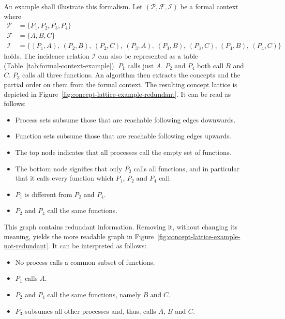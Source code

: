 \documentclass[a4paper, final, diplominf]{zih-template}
\begin{document}
An example shall illustrate this formalism.
Let $(\mathcal{P}, \mathcal{F}, \mathcal{I})$ be a formal context where
\begin{equation*}
	\begin{aligned}
		\mathcal{P} & = \{P_1, P_2, P_3, P_4\} \\
		\mathcal{F} & = \{A, B, C\} \\
		\mathcal{I} & = \big\{(P_1, A),~(P_2, B),~ (P_2, C),~ (P_3, A),~ (P_3, B),~ (P_3, C),~ (P_4, B),~ (P_4, C)\big\}
	\end{aligned}
\end{equation*}
holds. The incidence relation $\mathcal{I}$ can also be represented as a table (Table~\ref{tab:formal-context-example}).
$P_1$ calls just $A$. $P_2$ and $P_4$ both call $B$ and $C$. $P_3$ calls all three functions.
An algorithm then extracts the concepts and the partial order on them from the formal context.
The resulting concept lattice is depicted in Figure~\ref{fig:concept-lattice-example-redundant}.
It can be read as follows:
\begin{itemize}
	\item Process sets subsume  those that are reachable following edges downwards.\vspace{-0.5ex}
	\item Function sets subsume those that are reachable following edges upwards.\vspace{-0.5ex}
	\item The top node indicates that all processes call the empty set of functions.\vspace{-0.5ex}
	\item The bottom node signifies that only $P_3$ calls all functions, and in particular that it calls every function which $P_1$, $P_2$ and $P_4$ call.\vspace{-0.5ex}
	\item $P_1$ is different from $P_2$ and $P_4$.\vspace{-0.5ex}
	\item $P_2$ and $P_4$ call the same functions.
\end{itemize}
This graph contains redundant information.
Removing it, without changing its meaning, yields the more readable graph in Figure~\ref{fig:concept-lattice-example-not-redundant}.
It can be interpreted as follows:
\begin{itemize}
	\item No process calls a common subset of functions.\vspace{-0.5ex}
	\item $P_1$ calls $A$.\vspace{-0.5ex}
	\item $P_2$ and $P_4$ call the same functions, namely $B$ and $C$.\vspace{-0.5ex}
	\item $P_3$ subsumes all other processes and, thus, calls $A$, $B$ and $C$.
\end{itemize}
\end{document}
